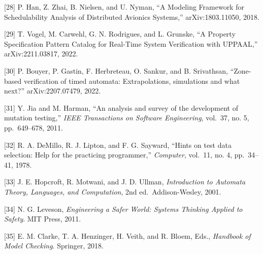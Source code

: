 \documentclass[
]{article}
\begin{document}
{[}28{]} P. Han, Z. Zhai, B. Nielsen, and U. Nyman, ``A Modeling
Framework for Schedulability Analysis of Distributed Avionics Systems,''
arXiv:1803.11050, 2018.

{[}29{]} T. Vogel, M. Carwehl, G. N. Rodrigues, and L. Grunske, ``A
Property Specification Pattern Catalog for Real-Time System Verification
with UPPAAL,'' arXiv:2211.03817, 2022.

{[}30{]} P. Bouyer, P. Gastin, F. Herbreteau, O. Sankur, and B.
Srivathsan, ``Zone-based verification of timed automata: Extrapolations,
simulations and what next?'' arXiv:2207.07479, 2022.

{[}31{]} Y. Jia and M. Harman, ``An analysis and survey of the
development of mutation testing,'' \emph{IEEE Transactions on Software
Engineering}, vol.~37, no. 5, pp.~649--678, 2011.

{[}32{]} R. A. DeMillo, R. J. Lipton, and F. G. Sayward, ``Hints on test
data selection: Help for the practicing programmer,'' \emph{Computer},
vol.~11, no. 4, pp.~34--41, 1978.

{[}33{]} J. E. Hopcroft, R. Motwani, and J. D. Ullman,
\emph{Introduction to Automata Theory, Languages, and Computation}, 2nd
ed.~Addison-Wesley, 2001.

{[}34{]} N. G. Leveson, \emph{Engineering a Safer World: Systems
Thinking Applied to Safety}. MIT Press, 2011.

{[}35{]} E. M. Clarke, T. A. Henzinger, H. Veith, and R. Bloem, Eds.,
\emph{Handbook of Model Checking}. Springer, 2018.
\end{document}
